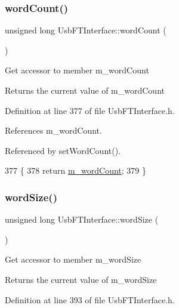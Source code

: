 \subsubsection{\texorpdfstring{word\+Count()}{wordCount()}}
{\footnotesize\ttfamily unsigned long Usb\+F\+T\+Interface\+::word\+Count (\begin{DoxyParamCaption}{ }\end{DoxyParamCaption})\hspace{0.3cm}{\ttfamily [inline]}}

Get accessor to member m\+\_\+word\+Count \begin{DoxyReturn}{Returns}
the current value of m\+\_\+word\+Count 
\end{DoxyReturn}


Definition at line 377 of file Usb\+F\+T\+Interface.\+h.



References m\+\_\+word\+Count.



Referenced by set\+Word\+Count().


\begin{DoxyCode}
377                              \{
378     \textcolor{keywordflow}{return} \hyperlink{classUsbFTInterface_a91c81850db2579afa6a5296e0bf0dbef}{m\_wordCount};
379   \}
\end{DoxyCode}
\mbox{\label{classUsbFTInterface_add098ede127a2089e3ac8ea615ed6d46}} 
\subsubsection{\texorpdfstring{word\+Size()}{wordSize()}}
{\footnotesize\ttfamily unsigned long Usb\+F\+T\+Interface\+::word\+Size (\begin{DoxyParamCaption}{ }\end{DoxyParamCaption})\hspace{0.3cm}{\ttfamily [inline]}}

Get accessor to member m\+\_\+word\+Size \begin{DoxyReturn}{Returns}
the current value of m\+\_\+word\+Size 
\end{DoxyReturn}


Definition at line 393 of file Usb\+F\+T\+Interface.\+h.




